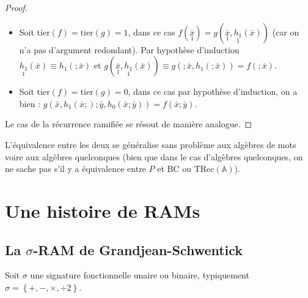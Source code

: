 \documentclass{report}
\newcommand{\TRec}[1]{\text{TRec}\left(\mathbb{#1}\right)}
\begin{document}
\begin{proof}
				\begin{itemize}[itemsep=-1mm]
					\item 	Soit $\text{tier}(f) = \text{tier}(g) = 1$, dans ce cas $f(\underset{1}{\bar{x}}) = g( \underset{1}{\bar{x}}, \underset{1}{h_1}(\bar{x}))$ (car on n'a pas d'argument redondant). Par hypothèse d'induction $\underset{1}{h_1}(\bar{x}) \equiv h_1(;\bar{x})$ et $g(\underset{1}{\bar{x}}, \underset{1}{h_1}(\bar{x})) \equiv g(; \bar{x}, h_1(;\bar{x})) = f(; \bar{x})$.
					
					\item 	Soit $\text{tier}(f) = \text{tier}(g) = 0$, dans ce cas par hypothèse d'induction, on a bien : $g( \bar{x}, h_1(\bar{x};) ; \bar{y}, h_0(\bar{x}; \bar{y})) = f(\bar{x} ; \bar{y})$.
				\end{itemize}
				
				Le cas de la récurrence ramifiée se résout de manière analogue.
			\end{proof}
			
	
			L'équivalence entre les deux se généralise sans problème aux algèbres de mots voire aux algèbres quelconques (bien que dans le cas d'algèbres quelconques, on ne sache pas s'il y a équivalence entre $P$ et $\text{BC}$ ou $\TRec{A}$).
			
			
	


	\pagebreak
	
	\section{Une histoire de RAMs}
	\label{sec:RAM_story}

	
		\subsection{La $\sigma$-RAM de Grandjean-Schwentick}
		\label{subsec:sigma_RAM}
		
		
		Soit $\sigma$ une signature fonctionnelle unaire ou binaire, typiquement $\sigma = \left\lbrace +, -, \times, \div 2\right\rbrace$. 
		
\end{document}
